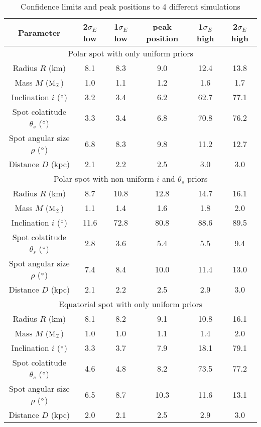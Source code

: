 \documentclass{wihuri}
\def\msun{{\rm M_{\odot}}}
\def\thetas{\theta_{s}}
\begin{document}
\begin{center}
\begin{table}
  \caption{Confidence limits and peak positions to 4 different simulations}
\label{table:params}
\begin{center}
  \begin{tabular}{| c | c | c | c | c | c |}
    \hline
     Parameter & 2$\sigma_{E}$ low & 1$\sigma_{E}$ low & peak position &1$\sigma_{E}$ high & 2$\sigma_{E}$ high \\ \hline
     \multicolumn{6}{c}{Polar spot with only uniform priors} \\ \hline
      Radius $R$ (km) & 8.1 & 8.3 & 9.0 & 12.4 & 13.8  \\ \hline
      Mass $M$ ($\msun$) & 1.0 & 1.1 & 1.2 & 1.6 & 1.7  \\ \hline
      Inclination $i$ ($\degree$) & 3.2 & 3.4 & 6.2 & 62.7 & 77.1 \\ \hline
      Spot colatitude $\thetas$ ($\degree$) & 3.3 & 3.4 & 6.8 & 70.8 & 76.2 \\ \hline
      Spot angular size $\rho$ ($\degree$) & 6.8 & 8.3 & 9.8 & 11.2 & 12.7 \\ \hline
      Distance $D$ (kpc) & 2.1 & 2.2 & 2.5 & 3.0 & 3.0 \\   \hline
      
      \multicolumn{6}{c}{Polar spot with non-uniform $i$ and $\thetas$ priors} \\ \hline
      Radius $R$ (km) & 8.7 & 10.8 & 12.8 & 14.7 & 16.1  \\ \hline
      Mass $M$ ($\msun$) & 1.1 & 1.4 & 1.6 & 1.8 & 2.0  \\ \hline
      Inclination $i$ ($\degree$) & 11.6 & 72.8 & 80.8 & 88.6 & 89.5 \\ \hline
      Spot colatitude $\thetas$ ($\degree$) & 2.8 & 3.6 & 5.4 & 5.5 & 9.4 \\ \hline %
      Spot angular size $\rho$ ($\degree$) & 7.4 & 8.4 & 10.0 & 11.4 & 13.0 \\ \hline
      Distance $D$ (kpc) & 2.1 & 2.2 & 2.5 & 2.9 & 3.0 \\ \hline
      
      \multicolumn{6}{c}{Equatorial spot with only uniform priors} \\ \hline
      Radius $R$ (km) & 8.1 & 8.2 & 9.1 & 10.8 & 16.1  \\ \hline
      Mass $M$ ($\msun$) & 1.0 & 1.0 & 1.1 & 1.4 & 2.0  \\ \hline
      Inclination $i$ ($\degree$) & 3.3 & 3.7 & 7.9 & 18.1 & 79.1 \\ \hline
      Spot colatitude $\thetas$ ($\degree$) & 4.6 & 4.8 & 8.2 & 73.5 & 77.2 \\ \hline
      Spot angular size $\rho$ ($\degree$) & 6.5 & 8.7 & 10.3 & 11.6 & 13.1 \\ \hline
      Distance $D$ (kpc) &  2.0 & 2.1 & 2.5 & 2.9 & 3.0 \\ \hline
      

\end{tabular}
\end{center}
\end{table}
\end{center}
\end{document}
